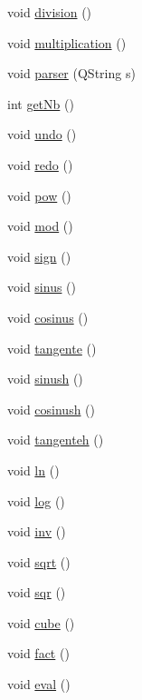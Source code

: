 \begin{DoxyCompactItemize}
void \hyperlink{class_pile_a48ef99542609f5033f58ebd23189f698}{division} ()
\item 
void \hyperlink{class_pile_ae5006ad08419fc6dcf65cbb4970199fe}{multiplication} ()
\item 
void \hyperlink{class_pile_ac0be84cde5594e29678125e600bd8898}{parser} (Q\-String s)
\item 
int \hyperlink{class_pile_acc36fadfcc65c9863a9d1d8d5dbe859a}{get\-Nb} ()
\item 
void \hyperlink{class_pile_af91a4b277236024aa5aab9ef410881bb}{undo} ()
\item 
void \hyperlink{class_pile_aa8319a2921d86236d135cff700a5f833}{redo} ()
\item 
void \hyperlink{class_pile_a20b1ece0cc61ecefc78e1a785ad8235f}{pow} ()
\item 
void \hyperlink{class_pile_a6d6092af4859ea5cefaa7959bb208774}{mod} ()
\item 
void \hyperlink{class_pile_ad6ce16606725f1b2fa1028073afc3b75}{sign} ()
\item 
void \hyperlink{class_pile_a3a55c324834f3c6a194fce721492748a}{sinus} ()
\item 
void \hyperlink{class_pile_a338ae80ae690356ce13d3e065fb61a4a}{cosinus} ()
\item 
void \hyperlink{class_pile_ac41a978af4eeff70aafccbfc5b1d865f}{tangente} ()
\item 
void \hyperlink{class_pile_aaf8dcd15ed6a1af20a451c67b4aa0431}{sinush} ()
\item 
void \hyperlink{class_pile_a4e5e6d1bc818b0f947e12c5ff7049094}{cosinush} ()
\item 
void \hyperlink{class_pile_acb89de235850fdc79448fa40506eb20e}{tangenteh} ()
\item 
void \hyperlink{class_pile_ab22aed5e5178d32a3e47d8f4c599c9c4}{ln} ()
\item 
void \hyperlink{class_pile_acaec5142e3afb5208091eecb6ac31f35}{log} ()
\item 
void \hyperlink{class_pile_a040844b7b06a3aa8a25c47079858e5d4}{inv} ()
\item 
void \hyperlink{class_pile_a15e52c1dca0ef1e78af39c69f814e01a}{sqrt} ()
\item 
void \hyperlink{class_pile_abd1c5a18cb8dd304e377d74fcec5a513}{sqr} ()
\item 
void \hyperlink{class_pile_aee724c6620382459f78fab4fb08749eb}{cube} ()
\item 
void \hyperlink{class_pile_a582a24a17a82fc63985900765b0499b4}{fact} ()
\item 
void \hyperlink{class_pile_a9fbff00a90c14aca3b093b080c8b0f0b}{eval} ()
\end{DoxyCompactItemize}


